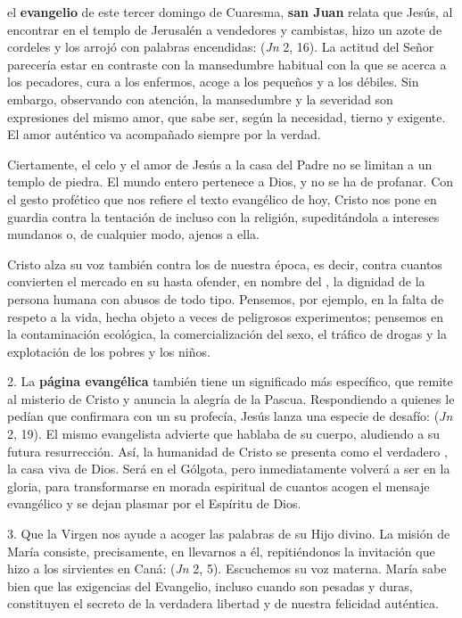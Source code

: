 
\begin{body}
 el \textbf{evangelio} de este tercer domingo de Cuaresma, \textbf{san Juan} relata que Jesús, al encontrar en el templo de Jerusalén a vendedores y cambistas, hizo un azote de cordeles y los arrojó con palabras encendidas:  (\textit{Jn} 2, 16). La actitud  del Señor parecería estar en contraste con la mansedumbre habitual con la que se acerca a los pecadores, cura a los enfermos, acoge a los pequeños y a los débiles. Sin embargo, observando con atención, la mansedumbre y la severidad son expresiones del mismo amor, que sabe ser, según la necesidad, tierno y exigente. El amor auténtico va acompañado siempre por la verdad.

Ciertamente, el celo y el amor de Jesús a la casa del Padre no se limitan a un templo de piedra. El mundo entero pertenece a Dios, y no se ha de profanar. Con el gesto profético que nos refiere el texto evangélico de hoy, Cristo nos pone en guardia contra la tentación de  incluso con la religión, supeditándola a intereses mundanos o, de cualquier modo, ajenos a ella.

Cristo alza su voz también contra los  de nuestra época, es decir, contra cuantos convierten el mercado en su  hasta ofender, en nombre del , la dignidad de la persona humana con abusos de todo tipo. Pensemos, por ejemplo, en la falta de respeto a la vida, hecha objeto a veces de peligrosos experimentos; pensemos en la contaminación ecológica, la comercialización del sexo, el tráfico de drogas y la explotación de los pobres y los niños.

2. La \textbf{página evangélica} también tiene un significado más específico, que remite al misterio de Cristo y anuncia la alegría de la Pascua. Respondiendo a quienes le pedían que confirmara con un  su profecía, Jesús lanza una especie de desafío:  (\textit{Jn} 2, 19). El mismo evangelista advierte que hablaba de su cuerpo, aludiendo a su futura resurrección. Así, la humanidad de Cristo se presenta como el verdadero , la casa viva de Dios. Será  en el Gólgota, pero inmediatamente volverá a ser  en la gloria, para transformarse en morada espiritual de cuantos acogen el mensaje evangélico y se dejan plasmar por el Espíritu de Dios.

3. Que la Virgen nos ayude a acoger las palabras de su Hijo divino. La misión de María consiste, precisamente, en llevarnos a él, repitiéndonos la invitación que hizo a los sirvientes en Caná:  (\textit{Jn} 2, 5). Escuchemos su voz materna. María sabe bien que las exigencias del Evangelio, incluso cuando son pesadas y duras, constituyen el secreto de la verdadera libertad y de nuestra felicidad auténtica.
\end{body}


